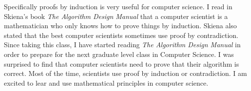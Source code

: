 \documentclass{article}
\begin{document}
\begin{itemize}
    Specifically proofs by induction is very useful for computer science.  I read in Skiena's book \emph{The Algorithm Design Manual} that a computer scientist is a mathematician who only knows how to prove things by induction.  Skiena also stated that the best computer scientists sometimes use proof by contradiction.  Since taking this class, I have started reading \emph{The Algorithm Design Manual} in order to prepare for the next graduate level class in Computer Science. I was surprised to find that computer scientists need to prove that their algorithm is correct.  Most of the time, scientists use proof by induction or contradiction.  I am excited to lear and use mathematical principles in computer science. 
\end{itemize}
\end{document}

